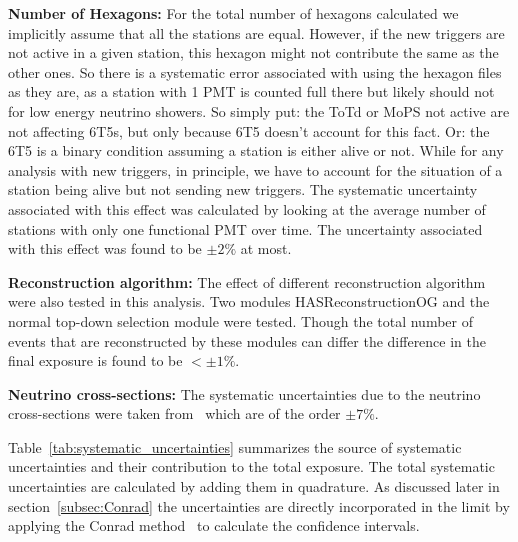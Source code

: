 \begin{description}
  \item \textbf{Number of Hexagons:} For the total number of hexagons calculated we implicitly assume that all the stations are equal. However, if the new triggers are not active in a given station, this hexagon might not contribute the same as the other ones. So there is a systematic error associated with using the hexagon files as they are, as a station with 1 PMT is counted full there but likely should not for low energy neutrino showers. So simply put: the ToTd or MoPS not active are not affecting 6T5s, but only because 6T5 doesn't account for this fact. Or: the 6T5 is a binary condition assuming a station is either alive or not. While for any analysis with new triggers, in principle, we have to account for the situation of a station being alive but not sending new triggers. The systematic uncertainty associated with this effect was calculated by looking at the average number of stations with only one functional PMT over time. The uncertainty associated with this effect was found to be $\pm 2\%$ at most. 
  \item \textbf{Reconstruction algorithm:} The effect of different reconstruction algorithm were also tested in this analysis. Two modules HASReconstructionOG and the normal top-down selection module were tested. Though the total number of events that are reconstructed by these modules can differ the difference in the final exposure is found to be $< \pm 1\%$. 
  \item \textbf{Neutrino cross-sections:} The systematic uncertainties due to the neutrino cross-sections were taken from~\cite{Cooper-Sarkar:2011jtt} which are of the order $\pm 7\%$.
\end{description}

Table~\ref{tab:systematic_uncertainties} summarizes the  source of systematic uncertainties and their contribution to the total exposure. The total systematic uncertainties are calculated by adding them in quadrature. As discussed later in section~\ref{subsec:Conrad} the uncertainties are directly incorporated in the limit by applying the Conrad method~\cite{Conrad:2002kn} to calculate the confidence intervals. 

